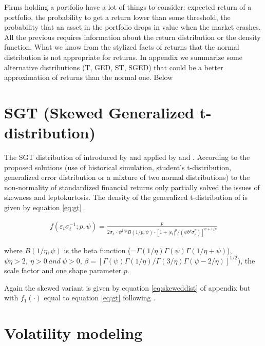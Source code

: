 \documentclass[a4paper, twoside]{templates/ociamthesis}
\begin{document}
\noindent Firms holding a portfolio have a lot of things to consider: expected return of a portfolio, the probability to get a return lower than some threshold, the probability that an asset in the portfolio drops in value when the market crashes. All the previous requires information about the return distribution or the density function. What we know from the stylized facts of returns that the normal distribution is not appropriate for returns. In appendix we summarize some alternative distributions (T, GED, ST, SGED) that could be a better approximation of returns than the normal one. Below

\hypertarget{sgt-skewed-generalized-t-distribution}{%
\section{SGT (Skewed Generalized t-distribution)}\label{sgt-skewed-generalized-t-distribution}}

\noindent The SGT distribution of introduced by \textcite{theodossiou1998} and applied by \textcite{bali2007} and \textcite{bali2008}. According to \textcite{bali2008} the proposed solutions (use of historical simulation, student's t-distribution, generalized error distribution or a mixture of two normal distributions) to the non-normality of standardized financial returns only partially solved the issues of skewness and leptokurtosis. The density of the generalized t-distribution of \textcite{mcdonald1988} is given by equation \eqref{eq:gt} \autocite{bollerslev1994}.

\begin{align}
f\left(\varepsilon_{t} \sigma_{t}^{-1} ; p, \psi\right)=\frac{p}{2 \sigma_{t} \ \cdot \psi^{1 / p} B(1 / p, \psi) \cdot\left[1+\left|\varepsilon_{t}\right|^{p} /\left(\psi b^{p} \sigma_{t}^{p}\right)\right]^{\psi+1 / p}}
 \label{eq:gt}
\end{align}

\noindent where \(B(1 / \eta, \psi)\) is the beta function (=\(\Gamma(1 / \eta) \Gamma(\psi) \Gamma(1 / \eta+\psi)\)), \(\psi\eta>2,\ \eta>0 \ and \ \psi >0\), \(\beta = [\Gamma(\psi)\Gamma(1 / \eta)/\Gamma(3 / \eta)\Gamma(\psi - 2/\eta)]^{1/2}\)), the scale factor and one shape parameter \(p\).

\noindent Again the skewed variant is given by equation \eqref{eq:skeweddist} of appendix but with \(f_1(\cdot)\) equal to equation \eqref{eq:gt} following \textcite{trottier2015}.

\hypertarget{vol-mod}{%
\section{Volatility modeling}\label{vol-mod}}
\end{document}
